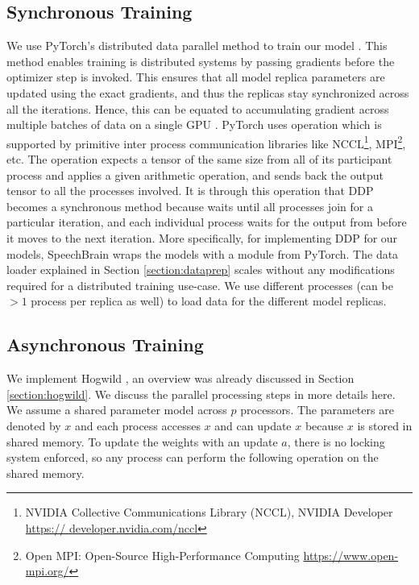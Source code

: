 \subsection{Synchronous Training}
We use PyTorch's distributed data parallel method to train our model \cite{Li2020PyTorchTraining}. This method enables training is distributed systems by passing gradients before the optimizer step is invoked. This ensures that all model replica parameters are updated using the exact gradients, and thus the replicas stay synchronized across all the iterations. Hence, this can be equated to accumulating gradient across multiple batches of data on a single GPU . PyTorch uses  operation which is supported by primitive inter process communication libraries like NCCL\footnote{NVIDIA Collective Communications Library (NCCL), NVIDIA Developer \href{https://developer.nvidia.com/nccl}{https:// developer.nvidia.com/nccl}}, MPI\footnote{Open MPI: Open-Source High-Performance Computing \href{https://www.open-mpi.org/}{https://www.open-mpi.org/}}, etc. The  operation expects a tensor of the same size from all of its participant process and applies a given arithmetic operation, and sends back the output tensor to all the processes involved. It is through this operation that DDP becomes a synchronous method because   waits until all processes join for a particular iteration, and each individual process waits for the output from  before it moves to the next iteration. More specifically, for implementing DDP for our models, SpeechBrain wraps the models with a  module from PyTorch. The data loader explained in Section \ref{section:dataprep} scales without any modifications required for a distributed training use-case. We use different processes (can be $>1$ process per replica as well) to load data for the different model replicas.

\subsection{Asynchronous Training}
We implement Hogwild \cite{Niu2011HOGWILD:Descent}, an overview was already discussed in Section \ref{section:hogwild}. We discuss the parallel processing steps in more details here. We assume a shared parameter model across $p$ processors. The parameters are denoted by $x$ and each process accesses $x$ and can update $x$ because $x$ is stored in shared memory. To update the weights with an update $a$, there is no locking system enforced, so any process can perform the following operation on the shared memory.


